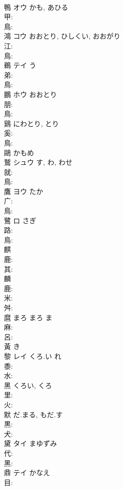 \documentclass[8pt]{extreport}
\begin{document}
\begin{CJK}{UTF8}{min}
\\	鴨	オウ	かも, あひる		
\\	甲: 
\\	鳥: 
\\	鴻	コウ	おおとり, ひしくい, おおがり		
\\	江: 
\\	鳥: 
\\	鵜	テイ	う		
\\	弟: 
\\	鳥: 
\\	鵬	ホウ	おおとり		
\\	朋: 
\\	鳥: 
\\	鷄		にわとり, とり				
\\	奚: 
\\	鳥: 
\\	鷗		かもめ				
\\	鷲	シュウ		す, わ, わせ	
\\	就: 
\\	鳥: 
\\	鷹	ヨウ	たか		
\\	广: 
\\	鳥: 
\\	鷺	ロ	さぎ		
\\	路: 
\\	鳥: 
\\	麒					
\\	鹿: 
\\	其: 
\\	麟					
\\	鹿: 
\\	米: 
\\	舛: 
\\	麿	まろ	まろ	ま	
\\	麻: 
\\	呂: 
\\	黃		き				
\\	黎	レイ	くろ.い	れ	
\\	黍: 
\\	水: 
\\	黑		くろい, くろ				
\\	里: 
\\	火: 
\\	默		だ.まる, もだ.す				
\\	黒: 
\\	犬: 
\\	黛	タイ	まゆずみ		
\\	代: 
\\	黑: 
\\	鼎	テイ	かなえ		
\\	目: 

\end{CJK}
\end{document}

